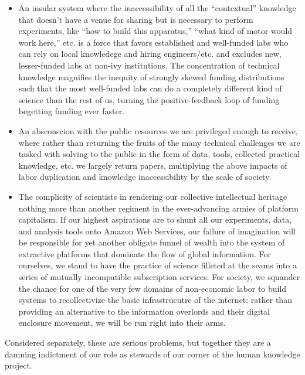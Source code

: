 \documentclass[notoc]{tufte-book}
\begin{document}
\begin{itemize}

\item
  An insular system where the inaccessibility of all the ``contextual''
  knowledge \citep{woolKnowledgeNetworksHow2020, barleyBackroomsScienceWork1994}  that doesn't have a venue for
  sharing but is necessary to perform experiments, like ``how to build
  this apparatus,'' ``what kind of motor would work here,'' etc. is a
  force that favors established and well-funded labs who can rely on
  local knowledege and hiring engineers/etc. and excludes new,
  lesser-funded labs at non-ivy institutions. The concentration of
  technical knowledge magnifies the inequity of strongly skewed funding
  distributions such that the most well-funded labs can do a completely
  different kind of science than the rest of us, turning the
  positive-feedback loop of funding begetting funding ever faster.
\item
  An absconscion with the public resources we are privileged enough to
  receive, where rather than returning the fruits of the many technical
  challenges we are tasked with solving to the public in the form of
  data, tools, collected practical knowledge, etc. we largely return
  papers, multiplying the above impacts of labor duplication and
  knowledge inaccessibility by the scale of society.
\item
  The complicity of scientists in rendering our collective intellectual
  heritage nothing more than another regiment in the ever-advancing
  armies of platform capitalism. If our highest aspirations are to shunt
  all our experiments, data, and analysis tools onto Amazon Web
  Services, our failure of imagination will be responsible for yet
  another obligate funnel of wealth into the system of extractive
  platforms that dominate the flow of global information. For ourselves,
  we stand to have the practice of science filleted at the seams into a
  series of mutually incompatible subscription services. For society, we
  squander the chance for one of the very few domains of non-economic
  labor to build systems to recollectivize the basic infrastrucutre of
  the internet: rather than providing an alternative to the information
  overlords and their digital enclosure movement, we will be run right
  into their arms.
\end{itemize}

Considered separately, these are serious problems, but together they are
a damning indictment of our role as stewards of our corner of the human
knowledge project.
\end{document}
